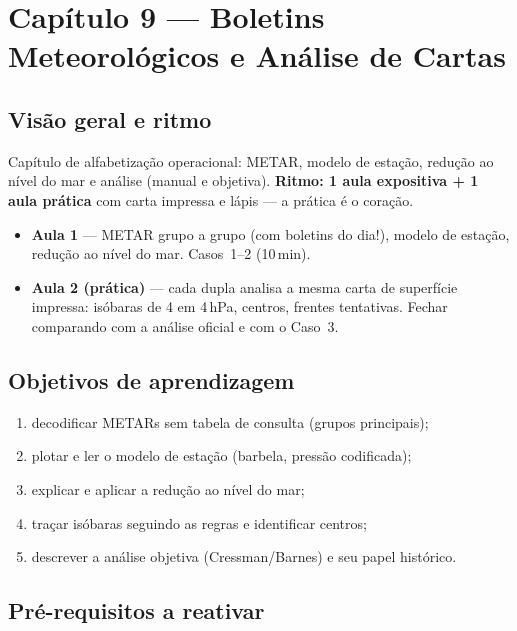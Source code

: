 \section{Capítulo 9 --- Boletins Meteorológicos e Análise de Cartas}

\subsection*{Visão geral e ritmo}

Capítulo de alfabetização operacional: METAR, modelo de estação, redução ao
nível do mar e análise (manual e objetiva). \textbf{Ritmo: 1 aula
expositiva + 1 aula prática} com carta impressa e lápis — a prática é o
coração.

\begin{itemize}
  \item \textbf{Aula 1} — METAR grupo a grupo (com boletins do dia!),
        modelo de estação, redução ao nível do mar. Casos~1--2 (10\,min).
  \item \textbf{Aula 2 (prática)} — cada dupla analisa a mesma carta de
        superfície impressa: isóbaras de 4 em 4\,hPa, centros, frentes
        tentativas. Fechar comparando com a análise oficial e com o
        Caso~3.
\end{itemize}

\subsection*{Objetivos de aprendizagem}

\begin{enumerate}
  \item decodificar METARs sem tabela de consulta (grupos principais);
  \item plotar e ler o modelo de estação (barbela, pressão codificada);
  \item explicar e aplicar a redução ao nível do mar;
  \item traçar isóbaras seguindo as regras e identificar centros;
  \item descrever a análise objetiva (Cressman/Barnes) e seu papel
        histórico.
\end{enumerate}

\subsection*{Pré-requisitos a reativar}

